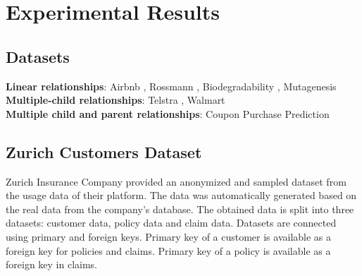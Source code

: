 \documentclass[fleqn,moreauthors,10pt]{ds_report}
\begin{document}


\section*{Experimental Results}

\subsection*{Datasets}

\textbf{Linear relationships}: Airbnb , Rossmann , Bio\-degradability , Mutagenesis \\
\textbf{Multiple-child relationships}: Telstra , Walmart  \\
\textbf{Multiple child and parent relationships}: Coupon Purchase Prediction 

\subsection*{Zurich Customers Dataset}
Zurich Insurance Company provided an anonymized and sampled dataset from the usage data of their platform. The data was automatically generated based on the real data from the company's database.
The obtained data is split into three datasets: customer data, policy data and claim data. Datasets are connected using primary and foreign keys. Primary key of a customer is available as a foreign key for policies and claims. Primary key of a policy is available as a foreign key in claims.


\end{document}
